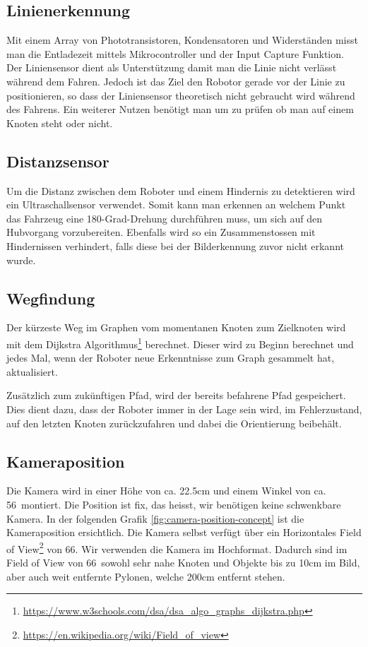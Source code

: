 \subsection{Linienerkennung}

Mit einem Array von Phototransistoren,  Kondensatoren und Widerständen misst man die Entladezeit mittels Mikrocontroller und der Input Capture Funktion. Der Liniensensor dient als Unterstützung damit man die Linie nicht verlässt während dem Fahren. Jedoch ist das Ziel den Robotor gerade vor der Linie zu positionieren, so dass der Liniensensor theoretisch nicht gebraucht wird während des Fahrens. Ein weiterer Nutzen benötigt man um zu prüfen ob man auf einem Knoten steht oder nicht.

\subsection{Distanzsensor}

Um die Distanz zwischen dem Roboter und einem Hindernis zu detektieren wird ein Ultraschallsensor verwendet. Somit kann man erkennen an welchem Punkt das Fahrzeug eine 180-Grad-Drehung durchführen muss, um sich auf den Hubvorgang vorzubereiten. Ebenfalls wird so ein Zusammenstossen mit Hindernissen verhindert, falls diese bei der Bilderkennung zuvor nicht erkannt wurde.

\subsection{Wegfindung}

Der kürzeste Weg im Graphen vom momentanen Knoten zum Zielknoten wird mit dem Dijkstra Algorithmus\footnote{\url{https://www.w3schools.com/dsa/dsa\_algo\_graphs\_dijkstra.php}} berechnet. Dieser wird zu Beginn berechnet und jedes Mal, wenn der Roboter neue Erkenntnisse zum Graph gesammelt hat, aktualisiert. 

Zusätzlich zum zukünftigen Pfad, wird der bereits befahrene Pfad gespeichert. Dies dient dazu, dass der Roboter immer in der Lage sein wird, im Fehlerzustand, auf den letzten Knoten zurückzufahren und dabei die Orientierung beibehält.

\subsection{Kameraposition}

Die Kamera wird in einer Höhe von ca. 22.5cm und einem Winkel von ca. 56\textdegree\ montiert. Die Position ist fix, das heisst, wir benötigen keine schwenkbare Kamera. In der folgenden Grafik \ref{fig:camera-position-concept} ist die Kameraposition ersichtlich. Die Kamera selbst verfügt über ein Horizontales Field of View\footnote{\url{https://en.wikipedia.org/wiki/Field_of_view}} von 66\textdegree. Wir verwenden die Kamera im Hochformat. Dadurch sind im Field of View von 66\textdegree\ sowohl sehr nahe Knoten und Objekte bis zu 10cm im Bild, aber auch weit entfernte Pylonen, welche 200cm entfernt stehen.

